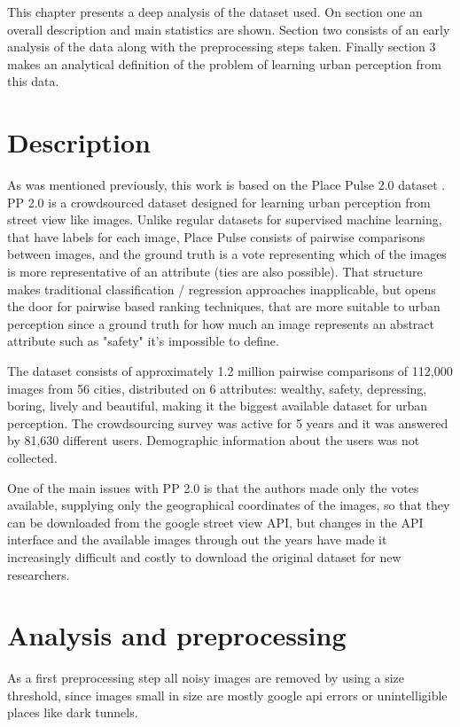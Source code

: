 This chapter presents a deep analysis of the dataset used. On section one an overall description
and main statistics are shown. Section two consists of an early analysis of the data along with
the preprocessing steps taken. Finally section 3 makes an analytical definition of the problem
of learning urban perception from this data.


\section{Description}
As was mentioned previously, this work is based on the Place Pulse 2.0 dataset \cite{hidalgo_placepulse}.
PP 2.0 is a crowdsourced dataset designed for learning urban perception from street view like images.
Unlike regular datasets for supervised machine learning, that have labels for each image, Place Pulse
consists of pairwise comparisons between images, and the ground truth is a vote representing which of
the images is more representative of an attribute (ties are also possible). That structure makes
traditional classification / regression approaches inapplicable, but opens the door for
pairwise based ranking techniques, that are more suitable to urban perception since a ground truth for
how much an image represents an abstract attribute such as "safety" it's impossible to define.

The dataset consists of approximately 1.2 million pairwise comparisons of 112,000 images from 56 cities,
distributed on 6 attributes: wealthy, safety, depressing, boring, lively and beautiful, making it
the biggest available dataset for urban perception. The crowdsourcing survey was
active for 5 years and it was answered by 81,630 different users. Demographic information
about the users was not collected.

One of the main issues with PP 2.0 is that the authors made only the votes available,
supplying only the geographical coordinates of the images, so that they can be downloaded from
the google street view API, but changes in the API interface and the available images through out
the years have made it increasingly difficult and costly to download the original dataset for
new researchers.

\section{Analysis and preprocessing}

As a first preprocessing step all noisy images are removed by using a size threshold,
since images small in size are mostly  google api errors or unintelligible places like
dark tunnels.

